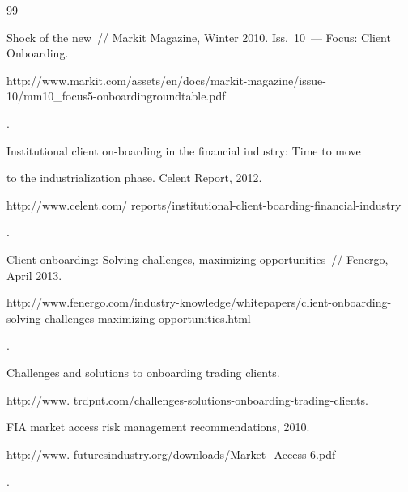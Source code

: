 {\small\frenchspacing


{%




\begin{thebibliography}{99}







Shock of the new~/\!\!/ Markit Magazine, Winter 2010. Iss.~10~--- Focus: Client Onboarding. {\sf


http://www.markit.com/assets/en/docs/markit-magazine/issue-10/mm10\_focus5-onboardingroundtable.pdf}.







 Institutional client on-boarding in the financial industry: Time to move


to the industrialization phase. Celent Report, 2012. {\sf


http://www.celent.com/ reports/institutional-client-boarding-financial-industry}.







Client onboarding: Solving challenges, maximizing opportunities~/\!\!/ Fenergo, April 2013. {\sf


http://www.fenergo.com/industry-knowledge/whitepapers/client-onboarding-solving-challenges-maximizing-opportunities.html}.










Challenges and solutions to onboarding trading clients.


{\sf http://www. trdpnt.com/challenges-solutions-onboarding-trading-clients}.







FIA market access risk management recommendations, 2010. {\sf


http://www. futuresindustry.org/downloads/Market\_Access-6.pdf}.












\end{thebibliography}}}
